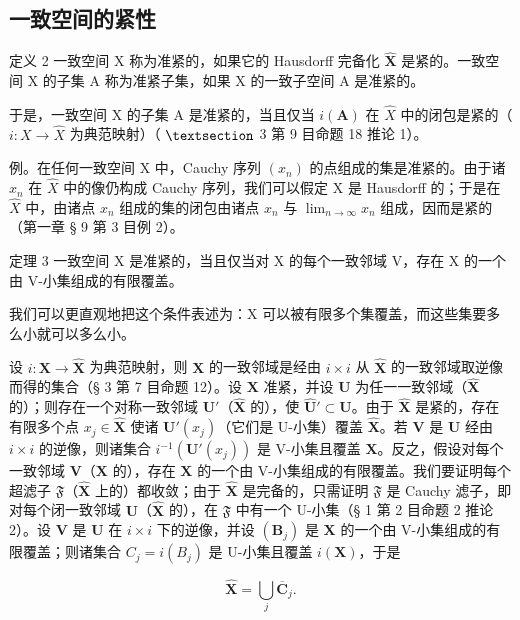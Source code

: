 \subsection{一致空间的紧性}

定义 2 一致空间 X 称为准紧的，如果它的 Hausdorff 完备化 \(\hat{\mathbf{X}}\) 是紧的。一致空间 X 的子集 A 称为准紧子集，如果 X 的一致子空间 A 是准紧的。

于是，一致空间 X 的子集 A 是准紧的，当且仅当 \(i(\mathbf{A})\) 在 \(\hat{X}\) 中的闭包是紧的（ \(i: X \rightarrow \hat{X}\) 为典范映射）（ \(\S\) 3 第 9 目命题 18 推论 1）。

例。在任何一致空间 X 中，Cauchy 序列 \((x_{n})\) 的点组成的集是准紧的。由于诸 \(x_{n}\) 在 \(\hat{X}\) 中的像仍构成 Cauchy 序列，我们可以假定 X 是 Hausdorff 的；于是在 \(\hat{X}\) 中，由诸点 \(x_{n}\) 组成的集的闭包由诸点 \(x_{n}\) 与 \(\lim_{n\to\infty}x_{n}\) 组成，因而是紧的（第一章 § 9 第 3 目例 2）。

定理 3 一致空间 X 是准紧的，当且仅当对 X 的每个一致邻域 V，存在 X 的一个由 V-小集组成的有限覆盖。

我们可以更直观地把这个条件表述为：X 可以被有限多个集覆盖，而这些集要多么小就可以多么小。

设 \(i: \mathbf{X} \to \hat{\mathbf{X}}\) 为典范映射，则 \(\mathbf{X}\) 的一致邻域是经由 \(i \times i\) 从 \(\hat{\mathbf{X}}\) 的一致邻域取逆像而得的集合（§ 3 第 7 目命题 12）。设 \(\mathbf{X}\) 准紧，并设 \(\mathbf{U}\) 为任一一致邻域（\(\hat{\mathbf{X}}\) 的）；则存在一个对称一致邻域 \(\mathbf{U}'\)（\(\hat{\mathbf{X}}\) 的），使 \(\hat{\mathbf{U}}' \subset \mathbf{U}\)。由于 \(\hat{\mathbf{X}}\) 是紧的，存在有限多个点 \(x_j \in \hat{\mathbf{X}}\) 使诸 \(\mathbf{U}'(x_j)\)（它们是 U-小集）覆盖 \(\hat{\mathbf{X}}\)。若 \(\mathbf{V}\) 是 \(\mathbf{U}\) 经由 \(i \times i\) 的逆像，则诸集合 \(i^{-1}(\mathbf{U}'(x_j))\) 是 V-小集且覆盖 \(\mathbf{X}\)。反之，假设对每个一致邻域 \(\mathbf{V}\)（\(\mathbf{X}\) 的），存在 \(\mathbf{X}\) 的一个由 V-小集组成的有限覆盖。我们要证明每个超滤子 \(\mathfrak{F}\)（\(\hat{\mathbf{X}}\) 上的）都收敛；由于 \(\hat{\mathbf{X}}\) 是完备的，只需证明 \(\mathfrak{F}\) 是 Cauchy 滤子，即对每个闭一致邻域 \(\mathbf{U}\)（\(\hat{\mathbf{X}}\) 的），在 \(\mathfrak{F}\) 中有一个 U-小集（§ 1 第 2 目命题 2 推论 2）。设 \(\mathbf{V}\) 是 \(\mathbf{U}\) 在 \(i \times i\) 下的逆像，并设 \((\mathbf{B}_j)\) 是 \(\mathbf{X}\) 的一个由 V-小集组成的有限覆盖；则诸集合 \(C_j = i(B_j)\) 是 U-小集且覆盖 \(i(\mathbf{X})\)，于是

\[
\hat {\mathbf {X}} = \bigcup_ {j} \overline {{\mathbf {C}}} _ {j}.
\]

